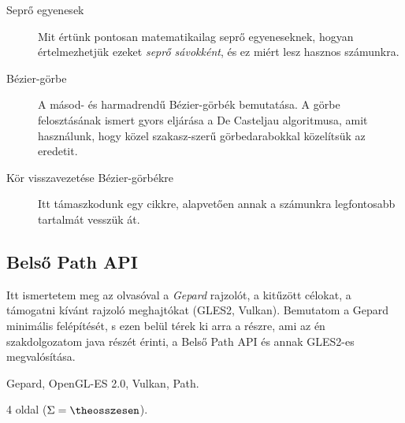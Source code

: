 \documentclass[12pt]{article}
\newcounter{osszesen}
\newcommand*{\oldalak}[1]{#1 oldal \setcounter{osszesen}{\theosszesen +
#1}($\Sigma=\theosszesen$)}
\begin{document}
\begin{description}
  \item[Seprő egyenesek] Mit értünk pontosan matematikailag seprő
  egyeneseknek, hogyan értelmezhetjük ezeket \emph{seprő sávokként}, és ez
  miért lesz hasznos számunkra.


  \item[Bézier-görbe] A másod- és harmadrendű Bézier-görbék
  bemutatása. A görbe felosztásának ismert gyors eljárása a De Casteljau
  algoritmusa, amit használunk, hogy közel szakasz-szerű görbedarabokkal
  közelítsük az eredetit.


  \item[Kör visszavezetése Bézier-görbékre] Itt támaszkodunk egy cikkre,
  alapvetően annak a számunkra legfontosabb tartalmát vesszük át.


\end{description}

\subsection{Belső Path API}

Itt ismertetem meg az olvasóval a \emph{Gepard} rajzolót, a kitűzött
célokat, a támogatni kívánt rajzoló meghajtókat (GLES2, Vulkan).
Bemutatom a Gepard minimális felépítését, s ezen belül térek ki arra a
részre, ami az én szakdolgozatom java részét érinti, a Belső Path API és
annak GLES2-es megvalósítása.


\begin{description}[noitemsep]
  \item[Kulcsszavak] Gepard, OpenGL-ES 2.0, Vulkan, Path.
  \item[Becsült oldalszám] \oldalak{4}.
\end{description}
\end{document}
